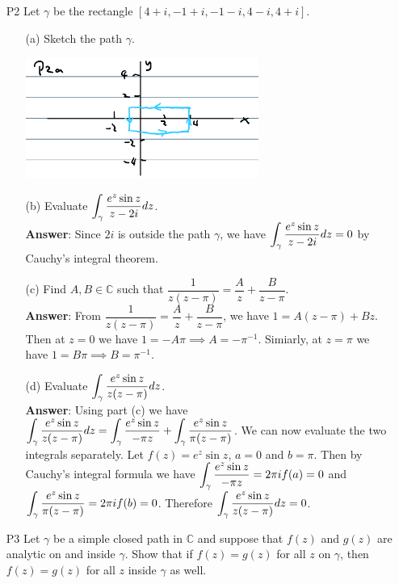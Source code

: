\documentclass{article}
\begin{document}
\begin{itemize}
    \item [P2] Let $\gamma$ be the rectangle $[4+i,-1+i,-1-i,4-i,4+i]$.
          \begin{itemize}
              \item [(a)] Sketch the path $\gamma$.
                    \begin{center}
                        \includegraphics[width=3in]{p3a.png}
                    \end{center}
              \item [(b)] Evaluate $\mathlarger{\int_\gamma\frac{e^z\sin z}{z-2i}dz}$.\\
                    \textbf{Answer}: Since $2i$ is outside the path $\gamma$, we have $\mathlarger{\int_\gamma\frac{e^z\sin z}{z-2i}dz}=0$ by Cauchy's integral theorem.
              \item [(c)] Find $A,B\in\mathbb{C}$ such that $\dfrac{1}{z(z-\pi)}=\dfrac{A}{z}+\dfrac{B}{z-\pi}$.\\
                    \textbf{Answer}: From $\dfrac{1}{z(z-\pi)}=\dfrac{A}{z}+\dfrac{B}{z-\pi}$, we have $1=A(z-\pi)+Bz$. Then at $z=0$ we have $1=-A\pi\implies A=-\pi^{-1}$. Simiarly, at $z=\pi$ we have $1=B\pi\implies B=\pi^{-1}$.
              \item [(d)] Evaluate $\mathlarger{\int_\gamma\frac{e^z\sin z}{z(z-\pi)}dz}$.\\
                    \textbf{Answer}: Using part (c) we have $\mathlarger{\int_\gamma\frac{e^z\sin z}{z(z-\pi)}dz=\int_\gamma\frac{e^z\sin z}{-\pi z}+\int_\gamma\frac{e^z\sin z}{\pi(z-\pi)}}$. We can now evaluate the two integrals separately. Let $f(z)=e^z\sin z$, $a=0$ and $b=\pi$. Then by Cauchy's integral formula we have $\mathlarger{\int_\gamma\frac{e^z\sin z}{-\pi z}=2\pi if(a)}=0$ and $\mathlarger{\int_\gamma\frac{e^z\sin z}{\pi(z-\pi)}=2\pi if(b)=0}$. Therefore $\mathlarger{\int_\gamma\frac{e^z\sin z}{z(z-\pi)}dz}=0$.
          \end{itemize}
    \item [P3] Let $\gamma$ be a simple closed path in $\mathbb{C}$ and suppose that $f(z)$ and $g(z)$ are analytic on and inside $\gamma$. Show that if $f(z)=g(z)$ for all $z$ on $\gamma$, then $f(z)=g(z)$ for all $z$ inside $\gamma$ as well.\\

\end{itemize}
\end{document}
